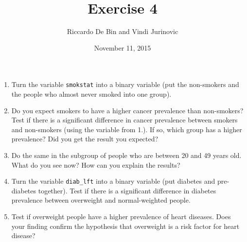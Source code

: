 \documentclass[]{article}
\title{Exercise 4}
\author{Riccardo De Bin and Vindi Jurinovic}
\date{November 11, 2015}
\begin{document}
\maketitle


\begin{enumerate}
\def\labelenumi{\arabic{enumi}.}
\itemsep1pt\parskip0pt
\item
  Turn the variable \texttt{smokstat} into a binary variable (put the
  non-smokers and the people who almost never smoked into one group).\\
\item
  Do you expect smokers to have a higher cancer prevalence than
  non-smokers? Test if there is a significant difference in cancer
  prevalence between smokers and non-smokers (using the variable from
  1.). If so, which group has a higher prevalence? Did you get the
  result you expected?\\
\item
  Do the same in the subgroup of people who are between 20 and 49 years
  old. What do you see now? How can you explain the results?\\
\item
  Turn the variable \texttt{diab\_lft} into a binary variable (put
  diabetes and pre-diabetes together). Test if there is a significant
  difference in diabetes prevalence between overweight and
  normal-weighted people.\\
\item
  Test if overweight people have a higher prevalence of heart diseases.
  Does your finding confirm the hypothesis that overweight is a risk
  factor for heart disease?
\end{enumerate}
\end{document}
